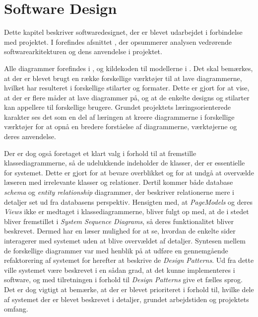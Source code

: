 \chapter{Software Design}
\label{chapter:software-design}
Dette kapitel beskriver softwaredesignet, der er blevet udarbejdet i forbindelse med projektet. 
I  forefindes afsnittet , der opsummerer analysen vedrørende softwarearkitekturen og dens anvendelse i projektet.

Alle diagrammer forefindes i , og kildekoden til modellerne i .
Det skal bemærkes, at der er blevet brugt en række forskellige værktøjer til at lave diagrammerne, hvilket har resulteret i forskellige stilarter og formater. 
Dette er gjort for at vise, at der er flere måder at lave diagrammer på, og at de enkelte designs og stilarter kan appellere til forskellige brugere.
Grundet projektets læringsorienterede karakter ses det som en del af læringen at kreere diagrammerne i forskellige værktøjer for at opnå en bredere forståelse af diagrammerne, værktøjerne og deres anvendelse.

Der er dog også foretaget et klart valg i forhold til at fremstille klassediagrammerne, så de udelukkende indeholder de klasser, der er essentielle for systemet.
Dette er gjort for at bevare overblikket og for at undgå at overvælde læseren med irrelevante klasser og relationer.
Dertil kommer både database \emph{schema} og \emph{entity relationship} diagrammer, der beskriver relationerne mere i detaljer set ud fra databasens perspektiv.
Hensigten med, at \emph{PageModels} og deres \emph{Views} ikke er medtaget i klassediagrammerne, bliver fulgt op med, at de i stedet bliver fremstillet i \emph{System Sequence Diagrams}, så deres funktionalitet bliver beskrevet.
Dermed har en læser mulighed for at se, hvordan de enkelte sider interagerer med systemet uden at blive overvældet af detaljer.
Syntesen mellem de forskellige diagrammer var med henblik på at udføre en gennemgående refaktorering af systemet for herefter at beskrive de \emph{Design Patterns}.
Ud fra dette ville systemet være beskrevet i en sådan grad, at det kunne implementeres i software, og med tilretningen i forhold til \emph{Design Patterns} give et fælles sprog.
Det er dog vigtigt at bemærke, at der er blevet prioriteret i forhold til, hvilke dele af systemet der er blevet beskrevet i detaljer, grundet arbejdstiden og projektets omfang.

